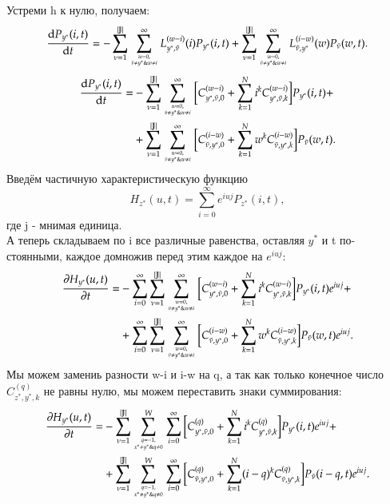 Устреми h к нулю, получаем:
\[
	\dv{P_{y^*}(i, t)}{t} = 
	- \sum_{\nu = 1}^{|\mathbb{J}|}\sum_{w=0,\atop \tilde{\nu} \neq y^*\& w\neq i}^{\infty}L^{(w-i)}_{y^*, \tilde{\nu}}(i)P_{y^*}(i, t)+
	\sum_{\nu = 1}^{|\mathbb{J}|}\sum_{w=0,\atop \tilde{\nu} \neq y^*\& w\neq i}^{\infty}
	L^{(i-w)}_{\tilde{\nu}, y^*}(w)P_{\tilde{\nu}}(w, t).
\]
\begin{align*}
	\dv{P_{y^*}(i, t)}{t} = &
	- \sum_{\nu = 1}^{|\mathbb{J}|}\sum_{w=0,\atop \tilde{\nu} \neq y^*\& w\neq i}^{\infty}
	\bigg[ C^{(w-i)}_{y^*, \tilde{\nu}, 0}+\sum^{N}_{k=1}i^kC^{(w-i)}_{y^*, \tilde{\nu}, k} \bigg]P_{y^*}(i, t)+ \\
	&+\sum_{\nu = 1}^{|\mathbb{J}|}\sum_{w=0,\atop \tilde{\nu} \neq y^*\& w\neq i}^{\infty}
	\bigg[ C^{(i-w)}_{\tilde{\nu},y^*, 0}+\sum^{N}_{k=1}w^kC^{(i-w)}_{\tilde{\nu},y^*, k} \bigg]P_{\tilde{\nu}}(w, t).
\end{align*}
Введём частичную характеристическую функцию \[H_{z^*}(u,t)=\sum_{i=0}^\infty e^{iuj}P_{z^*}(i, t),\] 
где j - мнимая единица.\\
А теперь складываем по i все различные равенства, оставляя \(y^*\) и t по-
стоянными, каждое домножив перед этим каждое на \(e^{iuj}\):
\begin{align*}
	\pdv{H_{y^*}(u, t)}{t} = &-\sum_{i = 0}^{\infty} 
	\sum_{\nu = 1}^{|\mathbb{J}|}\sum_{w=0,\atop \tilde{\nu} \neq y^*\& w\neq i}^{\infty}
	\bigg[ C^{(w-i)}_{y^*, \tilde{\nu}, 0}+\sum^{N}_{k=1}i^kC^{(w-i)}_{y^*, \tilde{\nu}, k} \bigg]P_{y^*}(i, t)e^{iuj}+ \\
	&+\sum_{i = 0}^{\infty} \sum_{\nu = 1}^{|\mathbb{J}|}\sum_{w=0,\atop \tilde{\nu} \neq y^*\& w\neq i}^{\infty}
	\bigg[ C^{(i-w)}_{\tilde{\nu}, y^*, 0}+\sum^{N}_{k=1}w^kC^{(i-w)}_{\tilde{\nu}, y^*, k} \bigg]P_{\tilde{\nu}}(w, t)e^{iuj}.
\end{align*}
Мы можем замениь разности w-i и i-w на q, а так как только конечное число \(C^{(q)}_{z^*,y^*, k}\) не равны нулю, мы можем переставить знаки суммирования:
\begin{align*}
	\pdv{H_{y^*}(u, t)}{t} = &-
	\sum_{\nu = 1}^{|\mathbb{J}|}\sum_{q = -1, \atop x^*\neq y^*\& q\neq 0}^{W}\sum_{i = 0}^{\infty} 
	\bigg[ C^{(q)}_{y^*, \tilde{\nu}, 0}+\sum^{N}_{k=1}i^kC^{(q)}_{y^*, \tilde{\nu}, k} \bigg]P_{y^*}(i, t)e^{iuj}+ \\
	&+\sum_{\nu = 1}^{|\mathbb{J}|}\sum_{q = -1, \atop x^*\neq y^*\& q\neq 0}^{W}\sum_{i = 0}^{\infty} 
	\bigg[ C^{(q)}_{\tilde{\nu}, y^*, 0}+\sum^{N}_{k=1}(i-q)^kC^{(q)}_{\tilde{\nu}, y^*, k} \bigg]P_{\tilde{\nu}}(i-q, t)e^{iuj}.
\end{align*}
